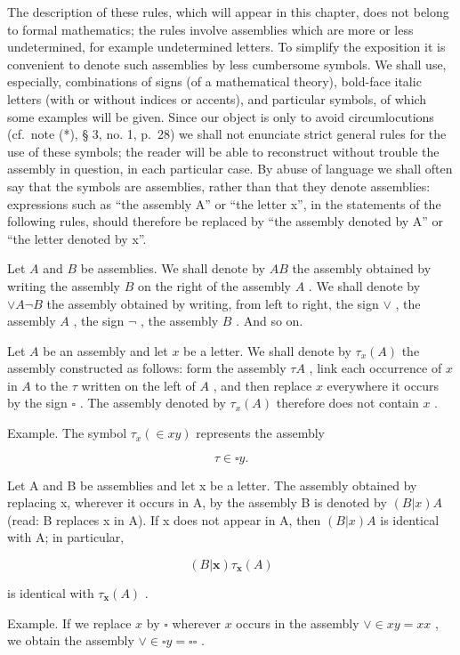 The description of these rules, which will appear in this chapter, does not belong to formal mathematics; the rules involve assemblies which are more or less undetermined, for example undetermined letters. To simplify the exposition it is convenient to denote such assemblies by less cumbersome symbols. We shall use, especially, combinations of signs (of a mathematical theory), bold-face italic letters (with or without indices or accents), and particular symbols, of which some examples will be given. Since our object is only to avoid circumlocutions (cf.~note (*), § 3, no. 1, p.~28) we shall not enunciate strict general rules for the use of these symbols; the reader will be able to reconstruct without trouble the assembly in question, in each particular case. By abuse of language we shall often say that the symbols are assemblies, rather than that they denote assemblies: expressions such as ``the assembly A'' or ``the letter x'', in the statements of the following rules, should therefore be replaced by ``the assembly denoted by A'' or ``the letter denoted by x''.

Let \(A\) and \(B\) be assemblies. We shall denote by \(AB\) the assembly obtained by writing the assembly \(B\) on the right of the assembly \(A\) . We shall denote by \(\vee A \neg B\) the assembly obtained by writing, from left to right, the sign \(\vee\) , the assembly \(A\) , the sign \(\neg\) , the assembly \(B\) . And so on.

Let \(A\) be an assembly and let \(x\) be a letter. We shall denote by \(\tau_{x}(A)\) the assembly constructed as follows: form the assembly \(\tau A\) , link each occurrence of \(x\) in \(A\) to the \(\tau\) written on the left of \(A\) , and then replace \(x\) everywhere it occurs by the sign \(\square\) . The assembly denoted by \(\tau_{x}(A)\) therefore does not contain \(x\) .

Example. The symbol \(\tau_{x}(\in xy)\) represents the assembly

\[
\tau \in \square y.
\]

Let A and B be assemblies and let x be a letter. The assembly obtained by replacing x, wherever it occurs in A, by the assembly B is denoted by \((B|x)A\) (read: B replaces x in A). If x does not appear in A, then \((B|x)A\) is identical with A; in particular,

\[
(B | \boldsymbol {x}) \tau_ {\boldsymbol {x}} (A)
\]

is identical with \(\tau_{\mathbf{x}}(A)\) .

Example. If we replace \(x\) by \(\square\) wherever \(x\) occurs in the assembly \(\vee \in xy = xx\) , we obtain the assembly \(\vee \in \square y = \square \square\) .

